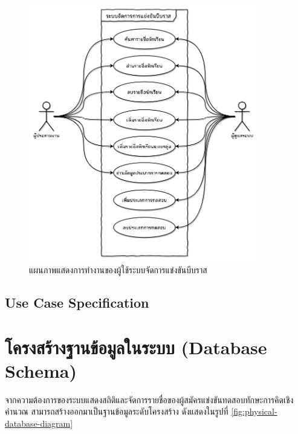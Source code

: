 \begin{figure}[H]
    \centering
    \includegraphics[width=100mm,scale=1.0]{diagrams/use-case-diagram.png}
    \caption{แผนภาพแสดงการทำงานของผู้ใช้ระบบจัดการแข่งขันบีบราส}
    \label{fig:use-case-diagram}
\end{figure}

\newpage

\subsection{Use Case Specification}










\newpage

\section{โครงสร้างฐานข้อมูลในระบบ (Database Schema)}

จากความต้องการของระบบแสดงสถิติและจัดการรายชื่อของผู้สมัครแข่งขันทดสอบทักษะการคิดเชิงคำนวณ สามารถสร้างออกมาเป็นฐานข้อมูลระดับโครงสร้าง ดังแสดงในรูปที่ \ref{fig:physical-database-diagram}

